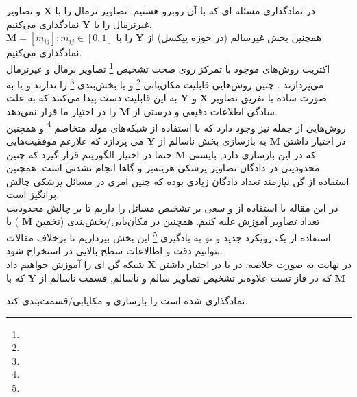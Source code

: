 \documentclass[12pt,onecolumn,a4paper]{article}
\begin{document}
\title{} 
\author{}
\date{\today}
\maketitle

\section{}
در نمادگذاری مسئله ای که با آن روبرو هستیم, تصاویر نرمال را با
$\mathbf{X}$
و تصاویر غیرنرمال را با 
$\mathbf{Y}$
نمادگذاری می‌کنیم.\\
همچنین بخش غیرسالم (در حوزه پیکسل) از $\mathbf{Y}$ را با 
$\mathbf{M} = [m_{ij}] ; m_{ij} \in [0,1]$
نمادگذاری می‌کنیم.
\\
اکثریت روش‌های موجود با تمرکز روی صحت تشخیص
\footnote{}
تصاویر نرمال و غیرنرمال می‌پردازند
\cite{zhou2021proxy}
.
چنین روش‌هایی قابلیت مکان‌یابی
\footnote{}
 و یا بخش‌بندی
 \footnote{}
را ندارند و یا به صورت ساده با تفریق تصاویر
$\mathbf{X}$
و
$\mathbf{Y}$
به این قابلیت دست پیدا می‌کنند
\cite{schlegl2017unsupervised} 
که به علت سادگی اطلاعات دقیقی و درستی از 
$\mathbf{M}$
را در اختیار ما قرار نمی‌دهد.
\\
روش‌هایی از جمله
\cite{yeh2017semantic}
نیز وجود دارد که با استفاده از شبکه‌های مولد متخاصم
\footnote{}
و همچنین در اختیار داشتن
$\mathbf{M}$
به بازسازی بخش ناسالم از
$\mathbf{Y}$
می پردازد که علارغم موفقیت‌هایی که در این بازسازی دارد, بایستی
$\mathbf{M}$
حتما در اختیار الگوریتم قرار گیرد که چنین محدودیتی در دادگان تصاویر پزشکی هزینه‌بر و گاها انجام نشدنی است. همچنین استفاده از گن نیازمند تعداد دادگان زیادی بوده که چنین امری در مسائل پزشکی چالش برانگیز است.
\\
در این مقاله با استفاده از
و 
سعی بر تشخیص مسائل  را داریم تا بر چالش محدودیت تعداد تصاویر آموزش غلبه کنیم.
همچنین در مکان‌یابی/بخش‌بندی (تخمین
$\mathbf{M}$
)
با استفاده از یک رویکرد جدید و نو به یادگیری
\footnote{}
 این بخش بپردازیم تا برخلاف مقالات \cite{schlegl2017unsupervised} بتوانیم دقت و اطالاعات سطح بالایی در استخراج شود.
 \\
 در نهایت به صورت خلاصه, در با در اختیار داشتن
 $\mathbf{X}$
 شبکه گن ای را آموزش خواهیم داد که در فاز تست علاوه‌بر تشخیص تصاویر سالم و ناسالم, قسمت ناسالم از 
$\mathbf{Y}$
  که با 
$\mathbf{M}$

 نمادگذاری شده است را بازسازی و مکایابی/قسمت‌بندی کند.
 


\begin{latin}

\end{latin}
\end{document}
